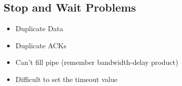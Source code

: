 \subsection{Stop and Wait Problems}
\begin{itemize}[nosep]
    \item Duplicate Data
    \item Duplicate ACKs
    \item Can't fill pipe (remember bandwidth-delay product)
    \item Difficult to set the timeout value
\end{itemize}